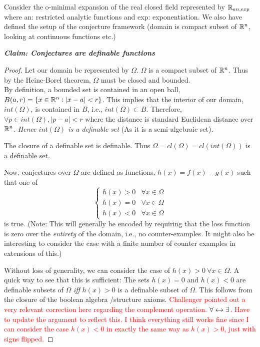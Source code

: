 Consider the o-minimal expansion of the real closed field represented by $\mathbb{R}_{an, exp}$ where an: restricted analytic functions and exp: exponentiation. We also have defined the setup of the conjecture framework (domain is compact subset of $\mathbb{R}^n$, looking at continuous functions etc.) \par\textbf{\textit{Claim: Conjectures are definable functions}}


\begin{proof}
    Let our domain be represented by $\Omega$. $\Omega$ is a compact subset of $\mathbb{R}^n$. Thus by the Heine-Borel theorem, $\Omega$ must be closed and bounded.\\ By definition, a bounded set is contained in an open ball, $B(a,r) = \{x\in\mathbb{R}^n:|x - a| < r\}$. This implies that the interior of our domain, $int(\Omega)$, is contained in $B$, i.e., $int(\Omega)\subset B$. Therefore, $\forall p\in int(\Omega), |p - a| < r$ where the distance is standard Euclidean distance over $\mathbb{R}^n$.\textit{ Hence $int(\Omega)$ is a definable set} (As it is a semi-algebraic set). 

    The closure of a definable set is definable. Thus $\Omega = cl(\Omega) = cl(int(\Omega))$ is a definable set.

    Now, conjectures over $\Omega$ are defined as functions, $h(x) = f(x) - g(x)$ such that one of
    \begin{equation*}
        \begin{cases}
            h(x) > 0 & \forall x \in \Omega \\
            h(x) = 0 & \forall x \in \Omega \\
            h(x) < 0 & \forall x \in \Omega 
        \end{cases}    
    \end{equation*}
    is true. (Note: This will generally be encoded by requiring that the loss function is zero over the \textit{entirety} of the domain, i.e., no counter-examples. It might also be interesting to consider the case with a finite number of counter examples in extensions of this.)
    \par Without loss of generality, we can consider the case of $h(x) > 0 \:\forall x\in\Omega$. A quick way to see that this is sufficient: The sets $h(x) = 0$ and $h(x) < 0 $ are definable subsets of $\Omega$ \textit{iff} $h(x) > 0$ is a definable subset of $\Omega$. This follows from the closure of the boolean algebra /structure axioms.
    \textcolor{red}{Challenger pointed out a very relevant correction here regarding the complement operation. $\forall\xleftrightarrow{}\exists$. Have to update the argument to reflect this. I think everything still works fine since I can consider the case $h(x) < 0$ in exactly the same way as $h(x) > 0$, just with signs flipped.}
    

\end{proof}
